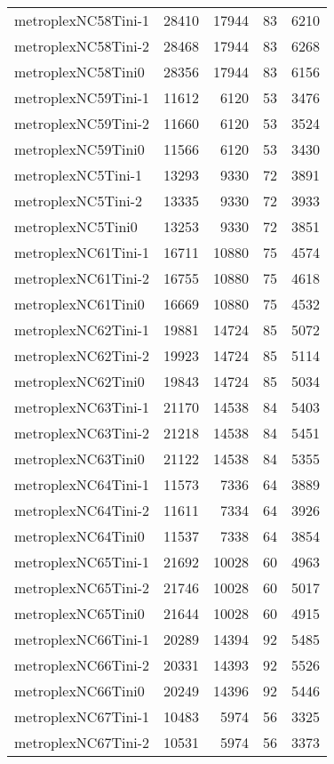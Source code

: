 \begin{longtable}{lrrrr}
metroplexNC58Tini-1 & 28410 & 17944 & 83 & 6210 \\
metroplexNC58Tini-2 & 28468 & 17944 & 83 & 6268 \\
metroplexNC58Tini0 & 28356 & 17944 & 83 & 6156 \\
metroplexNC59Tini-1 & 11612 & 6120 & 53 & 3476 \\
metroplexNC59Tini-2 & 11660 & 6120 & 53 & 3524 \\
metroplexNC59Tini0 & 11566 & 6120 & 53 & 3430 \\
metroplexNC5Tini-1 & 13293 & 9330 & 72 & 3891 \\
metroplexNC5Tini-2 & 13335 & 9330 & 72 & 3933 \\
metroplexNC5Tini0 & 13253 & 9330 & 72 & 3851 \\
metroplexNC61Tini-1 & 16711 & 10880 & 75 & 4574 \\
metroplexNC61Tini-2 & 16755 & 10880 & 75 & 4618 \\
metroplexNC61Tini0 & 16669 & 10880 & 75 & 4532 \\
metroplexNC62Tini-1 & 19881 & 14724 & 85 & 5072 \\
metroplexNC62Tini-2 & 19923 & 14724 & 85 & 5114 \\
metroplexNC62Tini0 & 19843 & 14724 & 85 & 5034 \\
metroplexNC63Tini-1 & 21170 & 14538 & 84 & 5403 \\
metroplexNC63Tini-2 & 21218 & 14538 & 84 & 5451 \\
metroplexNC63Tini0 & 21122 & 14538 & 84 & 5355 \\
metroplexNC64Tini-1 & 11573 & 7336 & 64 & 3889 \\
metroplexNC64Tini-2 & 11611 & 7334 & 64 & 3926 \\
metroplexNC64Tini0 & 11537 & 7338 & 64 & 3854 \\
metroplexNC65Tini-1 & 21692 & 10028 & 60 & 4963 \\
metroplexNC65Tini-2 & 21746 & 10028 & 60 & 5017 \\
metroplexNC65Tini0 & 21644 & 10028 & 60 & 4915 \\
metroplexNC66Tini-1 & 20289 & 14394 & 92 & 5485 \\
metroplexNC66Tini-2 & 20331 & 14393 & 92 & 5526 \\
metroplexNC66Tini0 & 20249 & 14396 & 92 & 5446 \\
metroplexNC67Tini-1 & 10483 & 5974 & 56 & 3325 \\
metroplexNC67Tini-2 & 10531 & 5974 & 56 & 3373 \\

\end{longtable}
